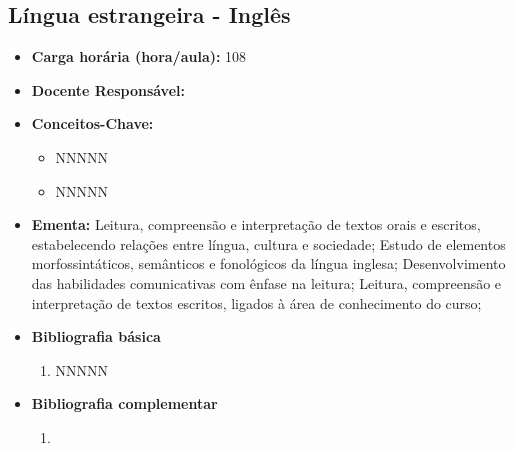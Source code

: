 \documentclass[11pt,fleqn]{book} %
\begin{document}
\subsection{Língua estrangeira - Inglês}\label{disc:ingles}
\begin{itemize}
	\item \textbf{Carga horária (hora/aula):} 108
	\item \textbf{Docente Responsável:}
	\item \textbf{Conceitos-Chave:}
	\begin{itemize}
		\item NNNNN
		\item NNNNN
	\end{itemize}
	\item \textbf{Ementa:} Leitura, compreensão e interpretação de textos orais e escritos, estabelecendo relações entre língua, cultura e sociedade;
	Estudo de elementos morfossintáticos, semânticos e fonológicos da língua inglesa;
	Desenvolvimento das habilidades comunicativas com ênfase na leitura;
	Leitura, compreensão e interpretação de textos escritos, ligados à área de conhecimento do curso;
	\item \textbf{Bibliografia básica}
	\begin{enumerate}
		\item NNNNN
	\end{enumerate}
	\item \textbf{Bibliografia complementar}
	\begin{enumerate}
		\item 
	\end{enumerate}	
\end{itemize}


\newpage
\end{document}
